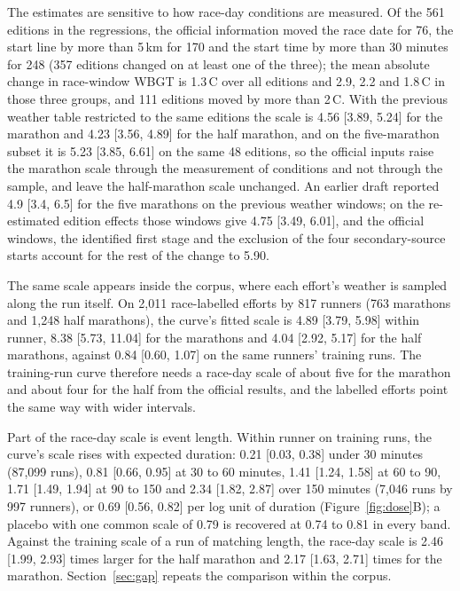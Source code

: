 \documentclass[11pt]{article}
\renewcommand{\_}{\textunderscore\allowbreak}
\begin{document}
The estimates are sensitive to how race-day conditions are measured. Of the 561 editions in the regressions, the official information moved the race date for 76, the start line by more than 5\,km for 170 and the start time by more than 30 minutes for 248 (357 editions changed on at least one of the three); the mean absolute change in race-window WBGT is 1.3\,\textdegree C over all editions and 2.9, 2.2 and 1.8\,\textdegree C in those three groups, and 111 editions moved by more than 2\,\textdegree C. With the previous weather table restricted to the same editions the scale is 4.56 [3.89, 5.24] for the marathon and 4.23 [3.56, 4.89] for the half marathon, and on the five-marathon subset it is 5.23 [3.85, 6.61] on the same 48 editions, so the official inputs raise the marathon scale through the measurement of conditions and not through the sample, and leave the half-marathon scale unchanged. An earlier draft reported 4.9 [3.4, 6.5] for the five marathons on the previous weather windows; on the re-estimated edition effects those windows give 4.75 [3.49, 6.01], and the official windows, the identified first stage and the exclusion of the four secondary-source starts account for the rest of the change to 5.90.

The same scale appears inside the corpus, where each effort's weather is sampled along the run itself. On 2{,}011 race-labelled efforts by 817 runners (763 marathons and 1{,}248 half marathons), the curve's fitted scale is 4.89 [3.79, 5.98] within runner, 8.38 [5.73, 11.04] for the marathons and 4.04 [2.92, 5.17] for the half marathons, against 0.84 [0.60, 1.07] on the same runners' training runs. The training-run curve therefore needs a race-day scale of about five for the marathon and about four for the half from the official results, and the labelled efforts point the same way with wider intervals.

Part of the race-day scale is event length. Within runner on training runs, the curve's scale rises with expected duration: 0.21 [0.03, 0.38] under 30 minutes (87{,}099 runs), 0.81 [0.66, 0.95] at 30 to 60 minutes, 1.41 [1.24, 1.58] at 60 to 90, 1.71 [1.49, 1.94] at 90 to 150 and 2.34 [1.82, 2.87] over 150 minutes (7{,}046 runs by 997 runners), or 0.69 [0.56, 0.82] per log unit of duration (Figure~\ref{fig:dose}B); a placebo with one common scale of 0.79 is recovered at 0.74 to 0.81 in every band. Against the training scale of a run of matching length, the race-day scale is 2.46 [1.99, 2.93] times larger for the half marathon and 2.17 [1.63, 2.71] times for the marathon. Section~\ref{sec:gap} repeats the comparison within the corpus.
\end{document}
